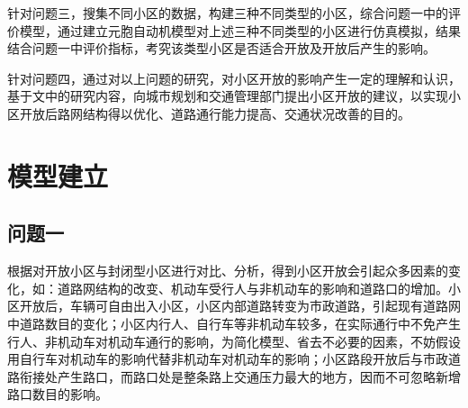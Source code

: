 \documentclass[fontset=windows,a4paper,12pt]{ctexart}
\begin{document}
	针对问题三，搜集不同小区的数据，构建三种不同类型的小区，综合问题一中的评价模型，通过建立元胞自动机模型对上述三种不同类型的小区进行仿真模拟，结果结合问题一中评价指标，考究该类型小区是否适合开放及开放后产生的影响。
	
	针对问题四，通过对以上问题的研究，对小区开放的影响产生一定的理解和认识，基于文中的研究内容，向城市规划和交通管理部门提出小区开放的建议，以实现小区开放后路网结构得以优化、道路通行能力提高、交通状况改善的目的。
  \section{模型建立}
	  
	\subsection{问题一}
		根据对开放小区与封闭型小区进行对比、分析，得到小区开放会引起众多因素的变化，如：道路网结构的改变、机动车受行人与非机动车的影响和道路口的增加。小区开放后，车辆可自由出入小区，小区内部道路转变为市政道路，引起现有道路网中道路数目的变化；小区内行人、自行车等非机动车较多，在实际通行中不免产生行人、非机动车对机动车通行的影响，为简化模型、省去不必要的因素，不妨假设用自行车对机动车的影响代替非机动车对机动车的影响；小区路段开放后与市政道路衔接处产生路口，而路口处是整条路上交通压力最大的地方，因而不可忽略新增路口数目的影响。

		
\end{document}
